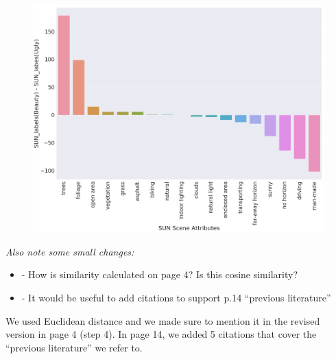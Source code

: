 \documentclass{paper}
\newenvironment{myquote}
{\definecolor{shadecolor}{rgb}{0.9,0.95,1} \begin{shaded*} \sf \em}
{\em\end{shaded*}}
\newenvironment{myquoteOrange}
{\definecolor{shadecolor}{rgb}{1,0.9,0.83} \begin{shaded*} \sf \em}
{\em\end{shaded*}}
\begin{document}

\begin{figure}[!htb]
    \centering
    \includegraphics[width=\columnwidth]{figs/SUN.png}
    \caption{}
    \label{fig:SUN}
\end{figure}

\begin{myquote}
    Also note some small changes: 
    \begin{itemize}
        \item - How is similarity calculated on page 4? Is this cosine similarity? 
        \item - It would be useful to add citations to support p.14 ``previous literature''
     \end{itemize}
\end{myquote}

\noindent We used Euclidean distance and we made sure to mention it in the revised version in page 4 (step 4). In page 14, we added 5 citations that cover the ``previous literature'' we refer to.

\end{document}
